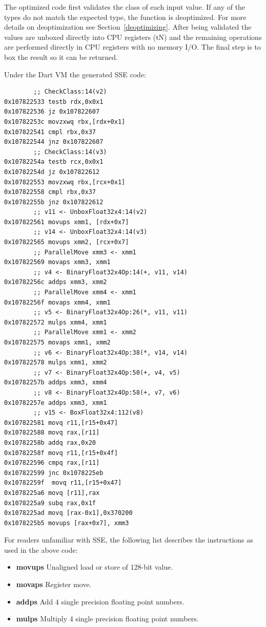 \documentclass[preprint]{sigplanconf}
\begin{document}
The optimized code first validates the class of each input value. If any of the
types do not match the expected type, the function is deoptimized. For more
details on deoptimization see Section~\ref{deoptimizing}. After being validated
the values are unboxed directly into CPU registers (tN) and the remaining
operations are performed directly in CPU registers with no memory I/O. The final
step is to box the result so it can be returned.

Under the Dart VM the generated SSE code:

\begin{verbatim}
        ;; CheckClass:14(v2)
0x107822533 testb rdx,0x0x1
0x107822536 jz 0x107822607
0x10782253c movzxwq rbx,[rdx+0x1]
0x107822541 cmpl rbx,0x37
0x107822544 jnz 0x107822607
        ;; CheckClass:14(v3)
0x10782254a testb rcx,0x0x1
0x10782254d jz 0x107822612
0x107822553 movzxwq rbx,[rcx+0x1]
0x107822558 cmpl rbx,0x37
0x10782255b jnz 0x107822612
        ;; v11 <- UnboxFloat32x4:14(v2)
0x107822561 movups xmm1, [rdx+0x7]
        ;; v14 <- UnboxFloat32x4:14(v3)
0x107822565 movups xmm2, [rcx+0x7]
        ;; ParallelMove xmm3 <- xmm1
0x107822569 movaps xmm3, xmm1
        ;; v4 <- BinaryFloat32x4Op:14(+, v11, v14)
0x10782256c addps xmm3, xmm2
        ;; ParallelMove xmm4 <- xmm1
0x10782256f movaps xmm4, xmm1
        ;; v5 <- BinaryFloat32x4Op:26(*, v11, v11)
0x107822572 mulps xmm4, xmm1
        ;; ParallelMove xmm1 <- xmm2
0x107822575 movaps xmm1, xmm2
        ;; v6 <- BinaryFloat32x4Op:38(*, v14, v14)
0x107822578 mulps xmm1, xmm2
        ;; v7 <- BinaryFloat32x4Op:50(+, v4, v5)
0x10782257b addps xmm3, xmm4
        ;; v8 <- BinaryFloat32x4Op:58(+, v7, v6)
0x10782257e addps xmm3, xmm1
        ;; v15 <- BoxFloat32x4:112(v8)
0x107822581 movq r11,[r15+0x47]
0x107822588 movq rax,[r11]
0x10782258b addq rax,0x20
0x10782258f movq r11,[r15+0x4f]
0x107822596 cmpq rax,[r11]
0x107822599 jnc 0x1078225eb
0x10782259f  movq r11,[r15+0x47]
0x1078225a6 movq [r11],rax
0x1078225a9 subq rax,0x1f
0x1078225ad movq [rax-0x1],0x370200
0x1078225b5 movups [rax+0x7], xmm3
\end{verbatim}

For readers unfamiliar with SSE, the following list describes the instructions
as used in the above code:

\begin{itemize}
\item \textbf{movups} Unaligned load or store of 128-bit value.
\item \textbf{movaps} Register move.
\item \textbf{addps} Add 4 single precision floating point numbers.
\item \textbf{mulps} Multiply 4 single precision floating point numbers.
\end{itemize}
\end{document}
